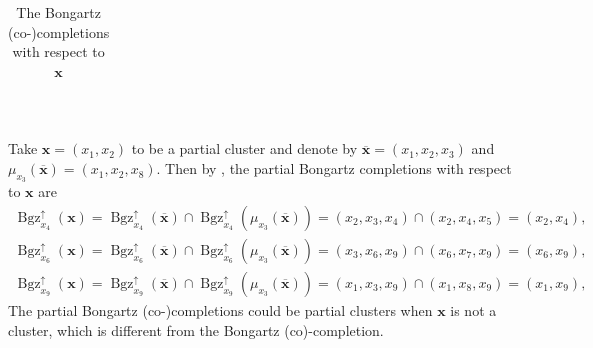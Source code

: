 \documentclass[11pt,reqno]{amsart}
\newcommand{\Neptune}{\mathord{\text{\tikz[baseline=-.5ex,scale=.13]{\draw[line width=.45pt] (0,0)--(0,1.8) (-.6,1.8)--(-.6,.8)--(.6,.8)--(.6,1.8) (-.35,.35)--(.35,.35);}}}}
\theoremstyle{plain}
\theoremstyle{definition}
\newtheorem{example}[theorem]{Example}
\numberwithin{equation}{section}
\newcommand\<{\langle}
\renewcommand\>{\rangle}
\def\xx{\mathbf{x}}%
\newcommand{\Bgzp}[2]{\operatorname{Bgz}^{\uparrow}_{#2}(#1)}
\newcommand{\suppu}[1]{\operatorname{\Neptune}_{\uparrow}^{#1}}
\newcommand{\ol}[1]{\overline{#1}}
\begin{document}
\begin{table}[h]
\begin{tabular}{|c||c|c|}
\end{tabular}
\\
\caption{The Bongartz (co-)completions with respect to ${\xx}$}
\end{table}

Take $\xx=(x_1,x_2)$ to be a partial cluster and
denote by $\ol{\xx}=(x_1,x_2,x_3)$ and $\mu_{x_3}(\ol{\xx})=(x_1,x_2,x_8)$.
Then by , the partial Bongartz completions with respect to $\xx$ are
\begin{align*}
    \Bgzp{\xx}{x_4}=\Bgzp{\ol{\xx}}{x_4}\cap\Bgzp{\mu_{x_3}(\ol{\xx})}{x_4}=(x_2,x_3,x_4)\cap(x_2,x_4,x_5)=(x_2,x_4),\\
    \Bgzp{\xx}{x_6}=\Bgzp{\ol{\xx}}{x_6}\cap\Bgzp{\mu_{x_3}(\ol{\xx})}{x_6}=(x_3,x_6,x_9)\cap(x_6,x_7,x_9)=(x_6,x_9),\\
    \Bgzp{\xx}{x_9}=\Bgzp{\ol{\xx}}{x_9}\cap\Bgzp{\mu_{x_3}(\ol{\xx})}{x_9}=(x_1,x_3,x_9)\cap(x_1,x_8,x_9)=(x_1,x_9),
\end{align*}
The partial Bongartz (co-)completions could be partial clusters when $\xx$ is not a cluster, which is different from the Bongartz (co)-completion.
\end{document}
